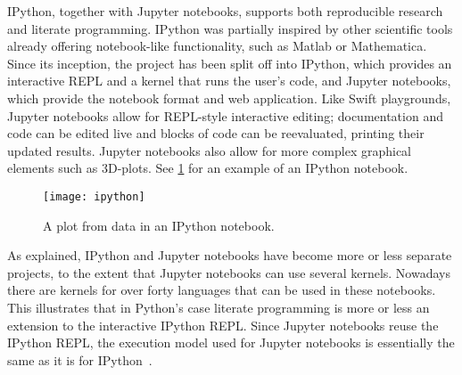 IPython, together with Jupyter notebooks,
supports both reproducible research and literate programming. IPython was
partially inspired by other scientific tools already offering notebook-like
functionality, such as Matlab or Mathematica. Since its inception, the project
has been split off into IPython, which provides an interactive REPL and a
kernel that runs the user's code, and Jupyter notebooks, which provide the
notebook format and web application. Like Swift playgrounds, Jupyter notebooks
allow for REPL-style interactive editing; documentation and code can be edited
live and blocks of code can be reevaluated, printing their updated results.
Jupyter notebooks also allow for more complex graphical elements such as
3D-plots. See \cref{fig:ipython} for an example of an IPython notebook.

\begin{figure}[htb]
  \centering
  \texttt{[image: ipython]}
  \caption{A plot from data in an IPython notebook.}
  \label{fig:ipython}
\end{figure}

As explained, IPython and Jupyter notebooks have become more or less separate
projects, to the extent that Jupyter notebooks can use several kernels.
Nowadays there are kernels for over forty languages that can be used in these
notebooks. This illustrates that in Python's case literate programming is more
or less an extension to the interactive IPython REPL. Since Jupyter notebooks
reuse the IPython REPL, the execution model used for Jupyter notebooks is
essentially the same as it is for IPython~\cite{ipython-execution}.

